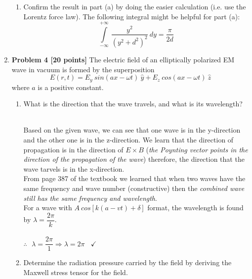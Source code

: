 \documentclass[fleqn]{article}
\begin{document}
\begin{enumerate}
\begin{enumerate}

      \item Confirm the result in part (a) by doing the easier calculation (i.e. use the Lorentz force law).
      The following integral might be helpful for part (a):
      $$
        \int\limits_{-\infty}^{+\infty} ~ \dfrac{y^2}{\left(y^2+d^2\right)^2} ~ dy=\dfrac{\pi}{2d} 
      $$


    \end{enumerate}

    \item \textbf{Problem 4 [20 points]} The electric field of an elliptically polarized EM wave in vacuum is formed by the superposition
      $$
        E(r,t)=E_y ~ sin(ax-\omega t) ~ \hat{y}+E_z ~ cos(ax-\omega t) ~ \hat{z}
      $$
      where $a$ is a positive constant.
      \begin{enumerate}
        \item What is the direction that the wave travels, and what is its wavelength?

          \textcolor{hwColor}{
            \\
            Based on the given wave, we can see that one wave is in the y-direction and the other one is in the z-direction. We learn that
            the direction of propagation is in the direction of $E \times B$ (\emph{the Poynting vector points in the direction of the propagation of the wave})
            therefore, the direction that the wave tarvels is in the x-direction.
            \\
            From page 387 of the textbook we learned that when two waves have the same frequency and wave number (constructive)
            then the \emph{combined wave still has the same frequency and wavelength}.
            \\
            For a wave with $A ~ cos\left[k\left(a-vt\right)+\delta\right]$ format, the wavelength is found by $\lambda=\dfrac{2\pi}{k}$.
            \\
            \\
            $
              \therefore ~~~ \lambda=\dfrac{2\pi}{1} \Longrightarrow \boxed{\lambda=2\pi} ~~~~ \checkmark
            $
          }

        \item Determine the radiation pressure carried by the field by deriving the Maxwell stress tensor for
        the field.


\end{enumerate}
\end{enumerate}
\end{document}
